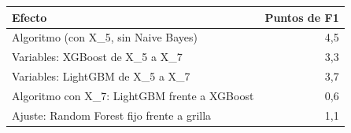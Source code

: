 
\begin{tabular}{lr}
\toprule
Efecto & Puntos de F1\\
\midrule
Algoritmo (con X\_5, sin Naive Bayes) & 4,5\\
Variables: XGBoost de X\_5 a X\_7 & 3,3\\
Variables: LightGBM de X\_5 a X\_7 & 3,7\\
Algoritmo con X\_7: LightGBM frente a XGBoost & 0,6\\
Ajuste: Random Forest fijo frente a grilla & 1,1\\
\bottomrule
\end{tabular}
